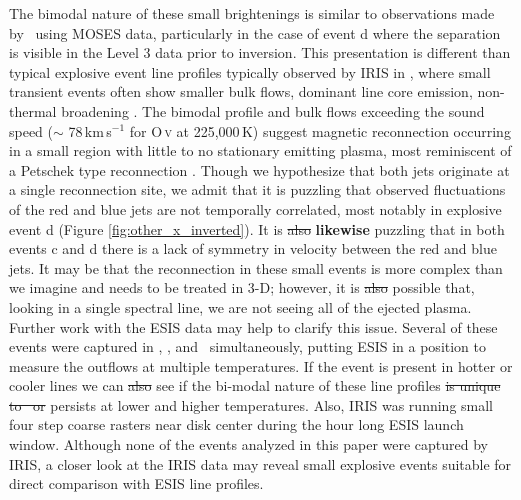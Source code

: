 	The bimodal nature of these small brightenings is similar to observations made by \citet{Rust2019} \heii \ using MOSES data, particularly in the case of event d where the separation is visible in the Level 3 data prior to inversion.
	This presentation is different than typical explosive event line profiles typically observed by IRIS in \siiv, where small transient events often show smaller bulk flows, dominant line core emission, non-thermal broadening \citep{Innes2015,Chitta2017}. 
	The bimodal profile and bulk flows exceeding the sound speed ($\sim$ 78\,km\,s$^{-1}$ for O\,\textsc{v} at 225,000\,K) suggest magnetic reconnection occurring in a small region with little to no stationary emitting plasma, most reminiscent of a Petschek type reconnection \citep{Innes1999}.
	Though we hypothesize that both jets originate at a single reconnection site, we admit that it is puzzling that observed fluctuations of the red and blue jets are not temporally correlated, most notably in explosive event d (Figure \ref{fig:other_x_inverted}).
    It is \sout{also} \textbf{likewise} puzzling that in both events c and d there is a lack of symmetry in velocity between the red and blue jets.
	It may be that the reconnection in these small events is more complex than we imagine and needs to be treated in 3-D; however, it is \sout{also} possible that, looking in a single spectral line, we are not seeing all of the ejected plasma. 
	Further work with the ESIS data may help to clarify this issue.
	Several of these events were captured in \hei, \mgxbright, and \ov \ simultaneously, putting ESIS in a position to measure the outflows at multiple temperatures. 
	If the event is present in hotter or cooler lines we can \sout{also} see if the bi-modal nature of these line profiles \sout{is unique to \ov \ or} persists at lower and higher temperatures.
	Also, IRIS was running small four step coarse rasters near disk center during the hour long ESIS launch window.
	Although none of the events analyzed in this paper were captured by IRIS, a closer look at the IRIS data may reveal small explosive events suitable for direct comparison with ESIS line profiles.
	
